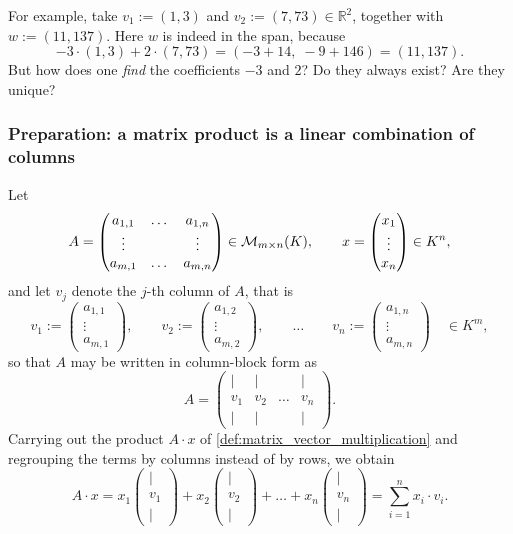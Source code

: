 For example, take $v_1 := (1,3)$ and $v_2 := (7,73) \in \mathbb{R}^2$, together with $w := (11, 137)$. Here $w$ is indeed in the span, because
\[
-3 \cdot (1,3) + 2 \cdot (7,73) = (-3 + 14, \; -9 + 146) = (11, 137).
\]
But how does one \emph{find} the coefficients $-3$ and $2$? Do they always exist? Are they unique?

\subsubsection{Preparation: a matrix product is a linear combination of columns}

Let
\[
A = \begin{pmatrix}
a_{1,1} & \dots & a_{1,n} \\
\vdots & & \vdots \\
a_{m,1} & \dots & a_{m,n}
\end{pmatrix} \in \mathcal{M}_{m \times n}(K),
\qquad
x = \begin{pmatrix} x_1 \\ \vdots \\ x_n \end{pmatrix} \in K^n,
\]
and let $v_j$ denote the $j$-th column of $A$, that is
\[
v_1 := \begin{pmatrix} a_{1,1} \\ \vdots \\ a_{m,1} \end{pmatrix},
\qquad
v_2 := \begin{pmatrix} a_{1,2} \\ \vdots \\ a_{m,2} \end{pmatrix},
\qquad \dots \qquad
v_n := \begin{pmatrix} a_{1,n} \\ \vdots \\ a_{m,n} \end{pmatrix}
\quad \in K^m,
\]
so that $A$ may be written in column-block form as
\[
A = \begin{pmatrix} | & | & & | \\ v_1 & v_2 & \dots & v_n \\ | & | & & | \end{pmatrix}.
\]
Carrying out the product $A \cdot x$ of \cref{def:matrix_vector_multiplication} and regrouping the terms by columns instead of by rows, we obtain
\begin{equation} \label{eq:product_is_combination}
A \cdot x
= x_1 \begin{pmatrix} | \\ v_1 \\ | \end{pmatrix}
+ x_2 \begin{pmatrix} | \\ v_2 \\ | \end{pmatrix}
+ \dots
+ x_n \begin{pmatrix} | \\ v_n \\ | \end{pmatrix}
= \sum_{i=1}^{n} x_i \cdot v_i.
\end{equation}

